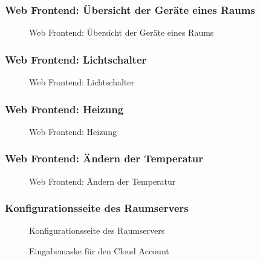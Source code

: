 \subsubsection{Web Frontend: Übersicht der Geräte eines Raums}
\begin{figure}[H]
\centering
{}
\caption{Web Frontend: Übersicht der Geräte eines Raums}
\label{fig:FE_Devices}
\end{figure}

\subsubsection{Web Frontend: Lichtschalter}
\begin{figure}[H]
\centering
{}
\caption{Web Frontend: Lichtschalter}
\label{fig:FE_Switch}
\end{figure}

\subsubsection{Web Frontend: Heizung}
\begin{figure}[H]
\centering
{}
\caption{Web Frontend: Heizung}
\label{fig:FE_Heating}
\end{figure}

\subsubsection{Web Frontend: Ändern der Temperatur}
\begin{figure}[H]
\centering
{}
\caption{Web Frontend: Ändern der Temperatur}
\label{fig:FE_Change}
\end{figure}


\subsubsection{Konfigurationsseite des Raumservers}
\begin{figure}[H]
\centering
{}
\caption{Konfigurationsseite des Raumservers}
\label{fig:ConfigRaum}
\end{figure}



\begin{figure}[H]
\centering
{}
\caption{Eingabemaske für den Cloud Account}
\label{fig:ConfigRaum_Login}
\end{figure}



